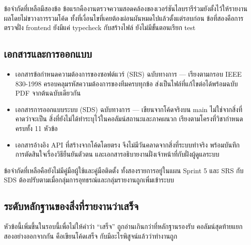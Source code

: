 ข้อจำกัดที่เหลือมีสองข้อ ข้อแรกคืองานตรวจความสอดคล้องของเวอร์ชันไลบรารีร่วมยังตั้งไว้ให้รายงานผลโดยไม่ขวางการรวมโค้ด ทั้งที่เงื่อนไขที่เคยต้องผ่อนผันหมดไปแล้วตั้งแต่รอบก่อน ข้อที่สองคือการตรวจฝั่ง frontend ยังมีแค่ typecheck กับสร้างไฟล์ ยังไม่มีขั้นตอนเรียก test

\subsection{เอกสารและการออกแบบ}

\begin{itemize}
 \item เอกสารข้อกำหนดความต้องการของซอฟต์แวร์ (SRS) ฉบับทางการ — เรียงตามกรอบ IEEE 830-1998 ครอบคลุมรหัสความต้องการของทีมครบทุกข้อ ส่งเป็นไฟล์ที่แก้ไขต่อได้พร้อมฉบับ PDF จากต้นฉบับเดียวกัน
 \item เอกสารการออกแบบระบบ (SDS) ฉบับทางการ — เขียนจากโค้ดจริงบน main ไม่ใช่จากสิ่งที่คาดว่าจะเป็น สิ่งที่ยังไม่ได้ทำระบุไว้ในคอลัมน์สถานะและภาคผนวก เรียงตามโครงที่วิชากำหนดครบทั้ง 11 หัวข้อ
 \item เอกสารอ้างอิง API ที่สร้างจากโค้ดโดยตรง จึงไม่มีวันคลาดจากสิ่งที่ระบบทำจริง พร้อมบันทึกการตัดสินใจเรื่องวิธียืนยันตัวตน และเอกสารอธิบายงานฝั่งเจ้าหน้าที่กับฝั่งผู้ดูแลระบบ
\end{itemize}

ข้อจำกัดที่เหลือคือยังไม่มีคู่มือผู้ใช้และคู่มือติดตั้ง ทั้งสองรายการอยู่ในแผน Sprint 5 และ SRS กับ SDS ต้องปรับตามเมื่อกลุ่มการอุทธรณ์และกลุ่มรายงานถูกเพิ่มเข้าระบบ

\subsection{ระดับหลักฐานของสิ่งที่รายงานว่าเสร็จ}

หัวข้อนี้เพิ่มขึ้นในรอบนี้เพื่อไม่ให้คำว่า ``เสร็จ'' ถูกอ่านเกินกว่าที่หลักฐานรองรับ คอลัมน์สุดท้ายแยกสองอย่างออกจากกัน คือเขียนโค้ดเสร็จ กับมีอะไรพิสูจน์แล้วว่าทำงานถูก

